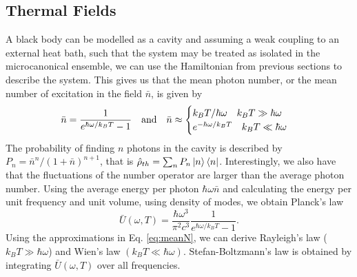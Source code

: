 \subsection{Thermal Fields}\label{sec:thermalFields}
A black body can be modelled as a cavity and assuming a weak coupling to an external heat bath, such that the system may be treated as isolated in the microcanonical ensemble, we can use the Hamiltonian from previous sections to describe the system. This gives us that the mean photon number, or the mean number of excitation in the field $\bar n$, is given by
\begin{equation}
    \bar n = \frac{1}{e^{\hbar\omega / k_B T} - 1} \quad\text{and}\quad \bar n \approx
    \begin{cases}
        k_B T/\hbar \omega \quad k_B T \gg \hbar \omega\\
        e^{-\hbar\omega /k_B T} \quad k_B T \ll \hbar \omega
    \end{cases}\label{eq:meanN}
\end{equation}
The probability of finding $n$ photons in the cavity is described by $P_n = \bar n^n / (1 + \bar n)^{n+1}$, that is $\hat{\rho}_{th} = \sum_n P_n \ket{n}\bra{n}$. Interestingly, we also have that the fluctuations of the number operator are larger than the average photon number.  Using the average energy per photon $\hbar \omega \bar n $ and calculating the energy per unit frequency and unit volume, using density of modes, we obtain Planck's law
\begin{equation}
    \bar U (\omega, T) = \frac{\hbar \omega^3}{\pi^2 c^3} \frac{1}{e^{\hbar\omega / k_B T} - 1}.
\end{equation}
Using the approximations in Eq. \eqref{eq:meanN}, we can derive Rayleigh's law ($k_B T \gg \hbar \omega$) and Wien's law $(k_B T \ll \hbar \omega)$. Stefan-Boltzmann's law is obtained by integrating $\bar U(\omega, T)$ over all frequencies. 